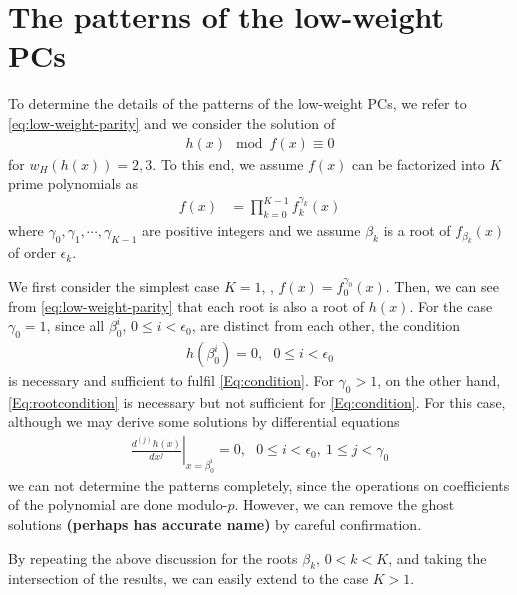 \section{The patterns of the low-weight PCs}
\label{sec3}
To determine the details of the patterns of the low-weight PCs, we refer to \eqref{eq:low-weight-parity} and we consider the solution of
\begin{align}
	h(x) \mod f(x) \equiv 0
	\label{Eq:condition}
\end{align}
for $w_H(h(x))=2,3$. To this end, we assume $f(x)$ can be factorized into $K$ prime polynomials as 
\begin{align}
f(x)&=\prod_{k=0}^{K-1}f_k^{\gamma_k}(x)
\end{align}
where $\gamma_0,\gamma_1,\cdots,\gamma_{K-1}$ are positive integers and we assume $\beta_k$ is a root of $f_{\beta_k}(x)$ of order $\epsilon_k$.


We first consider the simplest case $K=1$, \ie, $f(x) = f_0^{\gamma_0}(x)$. Then, we can see from \eqref{eq:low-weight-parity} that each root is also a root of $h(x)$. For the case $\gamma_0 = 1$, since all $\beta_0^i$, $0 \leq i < \epsilon_0$, are distinct from each other, the condition
\begin{align}
	h(\beta_0^i)=0,~~~ 0 \leq i < \epsilon_0
	\label{Eq:rootcondition}
\end{align}
is necessary and sufficient to fulfil \eqref{Eq:condition}. For $\gamma_0 > 1$, on the other hand, \eqref{Eq:rootcondition} is necessary but not sufficient for \eqref{Eq:condition}. For this case, although we may derive some solutions by differential equations
\begin{align}
\left.\frac{d^{(j)}h(x)}{d x^j}\right|_{x=\beta_0^i}=0,~~~0 \leq i < \epsilon_0,~1 \leq j < \gamma_0
\label{Eq:differential}
\end{align}
we can not determine the patterns completely, since the operations on coefficients of the polynomial are done modulo-$p$. However, we can remove the ghost solutions {\bf (perhaps has accurate name)} by careful confirmation.

By repeating the above discussion for the roots $\beta_k$, $0 < k < K$, and taking the intersection of the results, we can easily extend to the case $K>1$.







